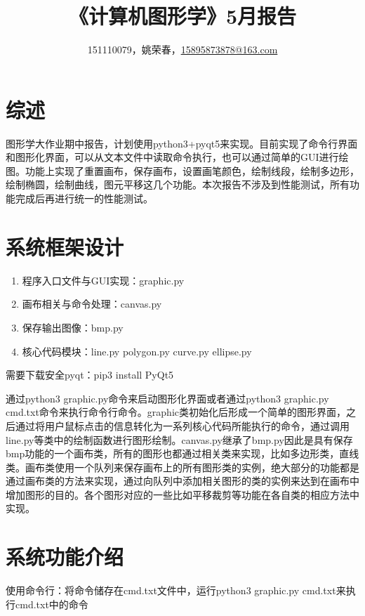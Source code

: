 \documentclass[a4paper,UTF8]{article}
\theoremstyle{definition}
\begin{document}
\title{\textbf{《计算机图形学》5月报告}}
\author{151110079，姚荣春，\href{mailto:15895873878@163.com}{15895873878@163.com}}
\maketitle

\section{综述}
图形学大作业期中报告，计划使用python3+pyqt5来实现。目前实现了命令行界面和图形化界面，可以从文本文件中读取命令执行，也可以通过简单的GUI进行绘图。功能上实现了重置画布，保存画布，设置画笔颜色，绘制线段，绘制多边形，绘制椭圆，绘制曲线，图元平移这几个功能。本次报告不涉及到性能测试，所有功能完成后再进行统一的性能测试。

\section{系统框架设计}

\begin{enumerate}
\item 程序入口文件与GUI实现：graphic.py
\item 画布相关与命令处理：canvas.py 
\item 保存输出图像：bmp.py
\item 核心代码模块：line.py polygon.py curve.py ellipse.py
\end{enumerate}

需要下载安全pyqt：pip3 install PyQt5

通过python3 graphic.py命令来启动图形化界面或者通过python3 graphic.py cmd.txt命令来执行命令行命令。graphic类初始化后形成一个简单的图形界面，之后通过将用户鼠标点击的信息转化为一系列核心代码所能执行的命令，通过调用line.py等类中的绘制函数进行图形绘制。canvas.py继承了bmp.py因此是具有保存bmp功能的一个画布类，所有的图形也都通过相关类来实现，比如多边形类，直线类。画布类使用一个队列来保存画布上的所有图形类的实例，绝大部分的功能都是通过画布类的方法来实现，通过向队列中添加相关图形的类的实例来达到在画布中增加图形的目的。各个图形对应的一些比如平移裁剪等功能在各自类的相应方法中实现。

\section{系统功能介绍}

使用命令行：将命令储存在cmd.txt文件中，运行python3 graphic.py cmd.txt来执行cmd.txt中的命令
\end{document}
